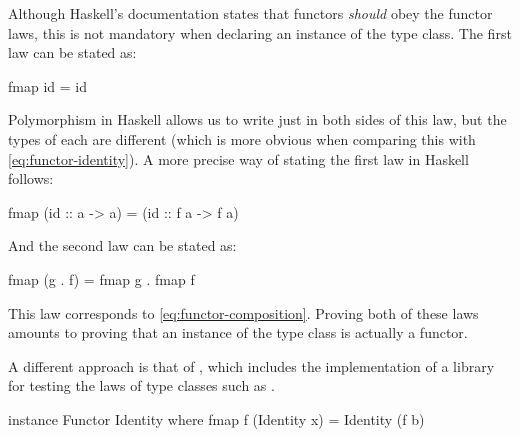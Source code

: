 Although Haskell's documentation states that functors \emph{should}
obey the functor laws, this is not mandatory when declaring an
instance of the  type class. The first law can be
stated as:
\begin{codehaskell}
fmap id = id
\end{codehaskell}
Polymorphism in Haskell allows us to write just  in
both sides of this law, but the types of each  are
different (which is more obvious when comparing this with
\eqref{eq:functor-identity}). A more precise way of stating the first
law in Haskell follows:
\begin{codehaskell}
fmap (id :: a -> a) = (id :: f a -> f a)
\end{codehaskell}
And the second law can be stated as:
\begin{codehaskell}
fmap (g . f) = fmap g . fmap f
\end{codehaskell}
This law corresponds to \eqref{eq:functor-composition}. Proving both
of these laws amounts to proving that an instance of the
 type class is actually a functor.

\begin{remark}

  A different approach is that of \parencite{jeuring-2012}, which
  includes the implementation of a library for testing the laws of
  type classes such as .

\end{remark}

\begin{example}
  \label{ex:functor-identity-haskell}


  \begin{codehaskell}
instance Functor Identity where
  fmap f (Identity x) = Identity (f b)
  \end{codehaskell}

\end{example}

